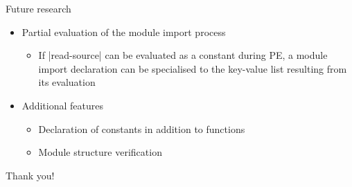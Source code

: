 \begin{frame}[fragile]{Future research}
\begin{itemize}
    \item Partial evaluation of the module import process
      \begin{itemize}
        \item If \linline|read-source| can be evaluated as a constant during PE,
        a module import declaration can be specialised to the key-value list
        resulting from its evaluation
      \end{itemize}
    \item Additional features
      \begin{itemize}
        \item Declaration of constants in addition to functions
        \item Module structure verification
      \end{itemize}
\end{itemize}
\end{frame}

\begin{frame}
\begin{center}
\Huge Thank you!
\end{center}
\end{frame}

